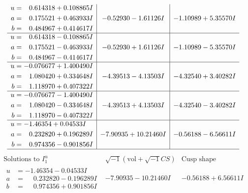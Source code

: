 \documentclass[1p]{elsarticle_modified}
\theoremstyle{definition}
\newcommand{\I}{\sqrt{-1}}
\begin{document}
$$\begin{array}{c|c|c}
\begin{aligned}
u &= \phantom{-}0.614318 + 0.108865 I \\
a &= \phantom{-}0.175521 + 0.463933 I \\
b &= \phantom{-}0.484967 + 0.414617 I\end{aligned}
 & -0.52930 - 1.61126 I & -1.10989 + 5.35570 I \\ \hline\begin{aligned}
u &= \phantom{-}0.614318 - 0.108865 I \\
a &= \phantom{-}0.175521 - 0.463933 I \\
b &= \phantom{-}0.484967 - 0.414617 I\end{aligned}
 & -0.52930 + 1.61126 I & -1.10989 - 5.35570 I \\ \hline\begin{aligned}
u &= -0.076677 + 1.400490 I \\
a &= \phantom{-}1.080420 + 0.334648 I \\
b &= \phantom{-}1.118970 + 0.407322 I\end{aligned}
 & -4.39513 - 4.13503 I & -4.32540 + 3.40282 I \\ \hline\begin{aligned}
u &= -0.076677 - 1.400490 I \\
a &= \phantom{-}1.080420 - 0.334648 I \\
b &= \phantom{-}1.118970 - 0.407322 I\end{aligned}
 & -4.39513 + 4.13503 I & -4.32540 - 3.40282 I \\ \hline\begin{aligned}
u &= -1.46354 + 0.04533 I \\
a &= \phantom{-}0.232820 + 0.196289 I \\
b &= \phantom{-}0.974356 - 0.901856 I\end{aligned}
 & -7.90935 + 10.21460 I & -0.56188 - 6.56611 I\\
 \hline 
 \end{array}$$\newpage$$\begin{array}{c|c|c}  
\text{Solutions to }I^u_{1}& \I (\text{vol} + \sqrt{-1}CS) & \text{Cusp shape}\\
 \hline 
\begin{aligned}
u &= -1.46354 - 0.04533 I \\
a &= \phantom{-}0.232820 - 0.196289 I \\
b &= \phantom{-}0.974356 + 0.901856 I\end{aligned}
 & -7.90935 - 10.21460 I & -0.56188 + 6.56611 I \\ \hline\begin{aligned}

\end{aligned}
\end{array}$$
\end{document}
